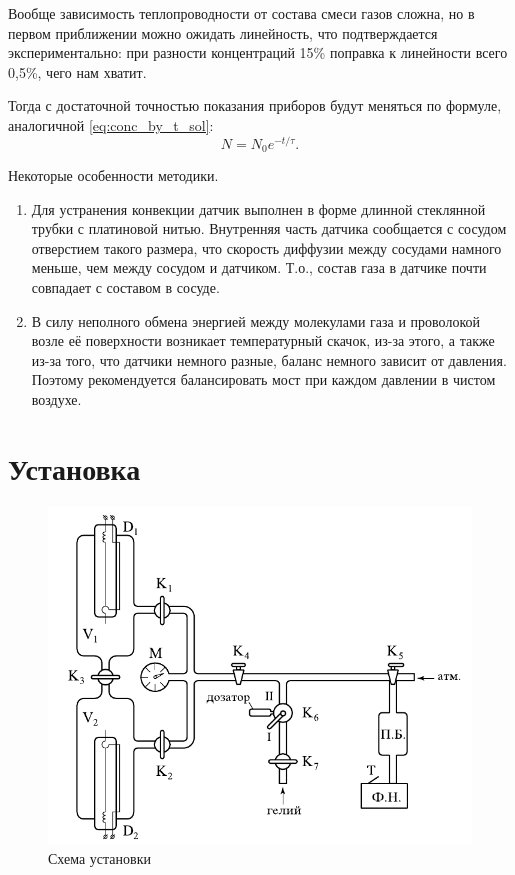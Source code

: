 \documentclass[12pt]{article}
\begin{document}
	Вообще зависимость теплопроводности от состава смеси газов сложна, но в первом приближении можно ожидать линейность, что подтверждается экспериментально: при разности концентраций 15\% поправка к линейности всего 0,5\%, чего нам хватит.
	
	Тогда с достаточной точностью показания приборов будут меняться по формуле, аналогичной \eqref{eq:conc_by_t_sol}:
	\begin{equation}
		\label{eq:meas_by_t}
		N=N_0 e^{-t/\tau}.
	\end{equation}
	
	Некоторые особенности методики.
	\begin{enumerate}
		\item Для устранения конвекции датчик выполнен в форме длинной стеклянной трубки с платиновой нитью. Внутренняя часть датчика сообщается с сосудом отверстием такого размера, что скорость диффузии между сосудами намного меньше, чем между сосудом и датчиком. Т.о., состав газа в датчике почти совпадает с составом в сосуде.
		\item В силу неполного обмена энергией между молекулами газа и проволокой возле её поверхности возникает температурный скачок, из-за этого, а также из-за того, что датчики немного разные, баланс немного зависит от давления. Поэтому рекомендуется балансировать мост при каждом давлении в чистом воздухе.
	\end{enumerate}
	
	\section*{Установка}
	
	\begin{figure}[h!]
	\caption{Схема установки}
	\label{fig:scheme}
	\begin{center}
	\includegraphics[scale=.6]{scheme.png}
	\end{center}
	\end{figure}
	
\end{document}
